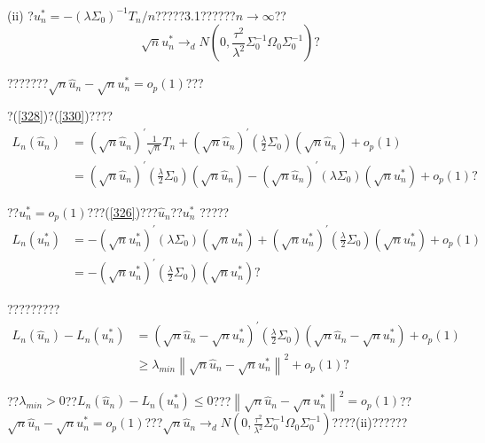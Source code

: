 \documentclass[a4paper,12pt,openany,oneside,utf-8]{ctexbook}
\begin{document}
	\
	
	\noindent (ii) ?$u_{n}^{*}=-\left(\lambda\Sigma_{0}\right)^{-1} T_{n}/n$?????3.1??????$n\rightarrow \infty$??
	$$\sqrt{n} u_{n}^{*} \rightarrow_{d} N\left(0,\frac{\tau^2}{\lambda^2} \Sigma_{0}^{-1} \Omega_{0} \Sigma_{0}^{-1}\right)\mbox{?}$$
	
	\noindent ???????$\sqrt{n} \hat{u}_{n}-\sqrt{n} u_{n}^{*}=o_{p}(1)$???
	
	?(\ref{328})?(\ref{330})????
	\begin{align}
		L_{n}\left(\hat{u}_{n}\right)&=\left(\sqrt{n} \hat{u}_{n}\right)^{\prime} \frac{1}{\sqrt{n}} T_{n}+\left(\sqrt{n} \hat{u}_{n}\right)^{\prime} \left(\frac{\lambda}{2}\Sigma_{0}\right)\left(\sqrt{n} \hat{u}_{n}\right)+o_{p}(1)\nonumber\\
		&=\left(\sqrt{n} \hat{u}_{n}\right)^{\prime}\left(\frac{\lambda}{2}\Sigma_{0}\right)\left(\sqrt{n} \hat{u}_{n}\right)-\left(\sqrt{n} \hat{u}_{n}\right)^{\prime}\left(\lambda \Sigma_{0}\right)\left(\sqrt{n} u_{n}^{*}\right)+o_{p}(1)\mbox{?}\nonumber
	\end{align}
	
	\noindent ??$u_{n}^{*}=o_p(1)$???(\ref{326})???$\hat{u}_{n}$??$u_{n}^{*}$ ?????
	\begin{align}
		L_{n}\left(u_{n}^{*}\right)&=-\left(\sqrt{n} u_{n}^{*}\right)^{\prime}\left(\lambda\Sigma_{0}\right)\left(\sqrt{n} u_{n}^{*}\right)+\left(\sqrt{n} u_{n}^{*}\right)^{\prime}\left(\frac{\lambda}{2}\Sigma_{0}\right)\left(\sqrt{n} u_{n}^{*}\right)+o_{p}(1)\nonumber\\
		&=-\left(\sqrt{n} u_{n}^{*}\right)^{\prime}\left(\frac{\lambda}{2}\Sigma_{0}\right)\left(\sqrt{n} u_{n}^{*}\right)\mbox{?}\nonumber
	\end{align}
	
	\noindent ?????????
	\begin{align}\label{331}
		L_{n}\left(\hat{u}_{n}\right)-L_{n}\left(u_{n}^{*}\right)&=\left(\sqrt{n} \hat{u}_{n}-\sqrt{n} u_{n}^{*}\right)^{\prime}\left(\frac{\lambda}{2}\Sigma_{0}\right)\left(\sqrt{n} \hat{u}_{n}-\sqrt{n} u_{n}^{*}\right)+o_{p}(1)\nonumber\\
		&\ge \lambda_{min}\left\|\sqrt{n} \hat{u}_{n}-\sqrt{n} u_{n}^{*}\right\|^{2}+o_{p}(1)\mbox{?}
	\end{align}
	
	\noindent ??$\lambda_{min}>0$??$L_{n}\left(\hat{u}_{n}\right)-L_{n}\left(u_{n}^{*}\right)\le 0$???$\left\|\sqrt{n} \hat{u}_{n}-\sqrt{n} u_{n}^{*}\right\|^{2}=o_{p}(1)$??~$\sqrt{n} \hat{u}_{n}-\sqrt{n} u_{n}^{*}=o_{p}(1)$???$\sqrt{n} \hat{u}_{n} \rightarrow_{d} N\left(0,\frac{\tau^2}{\lambda^2}\Sigma_{0}^{-1} \Omega_{0} \Sigma_{0}^{-1}\right)$????(ii)??????
	
\end{document}
